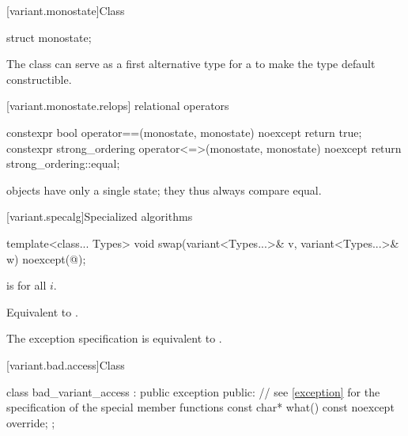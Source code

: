 [variant.monostate]{Class }%
%

\begin{itemdecl}
struct monostate{};
\end{itemdecl}

\begin{itemdescr}
\pnum
The class  can serve as a first alternative type for
a  to make the  type default constructible.
\end{itemdescr}


[variant.monostate.relops]{ relational operators}

%
%
\begin{itemdecl}
constexpr bool operator==(monostate, monostate) noexcept { return true; }
constexpr strong_ordering operator<=>(monostate, monostate) noexcept
{ return strong_ordering::equal; }
\end{itemdecl}

\begin{itemdescr}
\pnum
\begin{note}
 objects have only a single state; they thus always compare equal.
\end{note}
\end{itemdescr}

[variant.specalg]{Specialized algorithms}

%
\begin{itemdecl}
template<class... Types>
  void swap(variant<Types...>& v, variant<Types...>& w) noexcept(@\seebelow@);
\end{itemdecl}

\begin{itemdescr}
\pnum
\constraints
{}
is  for all $i$.

\pnum
\effects
Equivalent to .

\pnum
\remarks
The exception specification is equivalent to .
\end{itemdescr}

[variant.bad.access]{Class }%
%

\begin{codeblock}
class bad_variant_access : public exception {
public:
  // see \ref{exception} for the specification of the special member functions
  const char* what() const noexcept override;
};
\end{codeblock}

